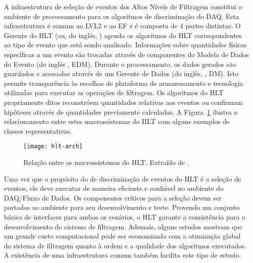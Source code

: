 A infraestrutura de seleção de eventos dos Altos Níveis de Filtragem constitui
o ambiente de processamento para os algoritmos de discriminação do DAQ. Esta
infraestrutura é comum ao LVL2 e ao EF e é composta de 4 partes distintas. O
Gerente do HLT (ou, do inglês, ) agenda os algoritmos do HLT
correspondentes ao tipo de evento que está sendo analisado. Informações sobre
quantidades físicas específicas a um evento são trocadas através de
componentes do Modelo de Dados do Evento (do inglês ,
EDM). Durante o processamento, os dados gerados são guardados e acessados
através de um Gerente de Dados (do inglês, , DM). Isto
permite transparência às escolhas de plataforma de armazenamento e tecnologia
utilizadas para executar as operações de filtragem. Os algoritmos do HLT
propriamente ditos reconstróem quantidades relativas aos eventos ou confirmam
hipóteses através de quantidades previamente calculadas. A
Figura~\ref{fig:hlt-arch} ilustra o relacionamento entre estes macrossistemas
do HLT com alguns exemplos de classes representativas.

\begin{figure}
\begin{center}
\texttt{[image: hlt-arch]}
\end{center}
\caption[Relação entre os macrossistemas do HLT.]{Relação entre os
macrossistemas do HLT. Extraído de \cite{hlt-tdr}.}
\label{fig:hlt-arch}
\end{figure}

Uma vez que o propósito do  de discriminação de eventos do HLT é
a seleção de eventos, ele deve executar de maneira eficiente e confiável no
ambiente do DAQ/Fluxo de Dados. Os componentes críticos para a seleção devem
ser portados ao ambiente  para seu desenvolvimento e
teste. Provendo um conjunto básico de interfaces para ambos os cenários, o HLT
garante a consistência para o desenvolvimento do sistema de
filtragem. Ademais, alguns estudos \cite{jb:e-gamma} mostram que um grande
custo computacional pode ser economizado com a otimização global do sistema de
filtragem quanto à ordem e a qualidade dos algoritmos executados. A existência
de uma infraestrutura comum também facilita este tipo de estudo.

